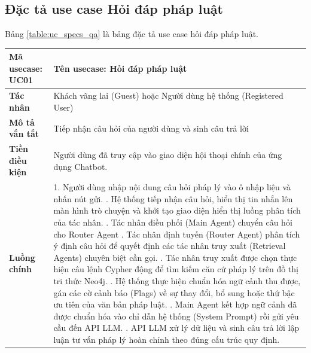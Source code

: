 \documentclass[../DoAn.tex]{subfiles}
\begin{document}
\subsection{Đặc tả use case Hỏi đáp pháp luật}
Bảng \ref{table:uc_specs_qa} là bảng đặc tả use case hỏi đáp pháp luật.
\begin{table}[H]
\centering
\begin{tabular}{|p{3.5cm}|p{11.5cm}|}
\hline
\textbf{Mã usecase:} UC01 & \textbf{Tên usecase:} Hỏi đáp pháp luật\\ \hline
\textbf{Tác nhân} & Khách vãng lai (Guest) hoặc Người dùng hệ thống (Registered User) \\ \hline
\textbf{Mô tả vắn tắt} & Tiếp nhận câu hỏi của người dùng và sinh câu trả lời \\ \hline
\textbf{Tiền điều kiện} & Người dùng đã truy cập vào giao diện hội thoại chính của ứng dụng Chatbot. \\ \hline
\textbf{Luồng chính} & 
1. Người dùng nhập nội dung câu hỏi pháp lý vào ô nhập liệu và nhấn nút gửi. \newline
2. Hệ thống tiếp nhận câu hỏi, hiển thị tin nhắn lên màn hình trò chuyện và khởi tạo giao diện hiển thị luồng phân tích của tác nhân. \newline
3. Tác nhân điều phối (Main Agent) chuyển câu hỏi cho Router Agent \newline
4. Tác nhân định tuyến (Router Agent) phân tích ý định câu hỏi để quyết định các tác nhân truy xuất (Retrieval Agents) chuyên biệt cần gọi. \newline
5. Tác nhân truy xuất được chọn thực hiện câu lệnh Cypher động để tìm kiếm căn cứ pháp lý trên đồ thị tri thức Neo4j. \newline
6. Hệ thống thực hiện chuẩn hóa ngữ cảnh thu được, gán các cờ cảnh báo (Flags) về sự thay đổi, bổ sung hoặc thứ bậc ưu tiên của văn bản pháp luật. \newline
7. Main Agent kết hợp ngữ cảnh đã được chuẩn hóa vào chỉ dẫn hệ thống (System Prompt) rồi gửi yêu cầu đến API LLM. \newline
8. API LLM xử lý dữ liệu và sinh câu trả lời lập luận tư vấn pháp lý hoàn chỉnh theo đúng cấu trúc quy định. \\ \hline
\end{tabular}
\end{table}
\end{document}
